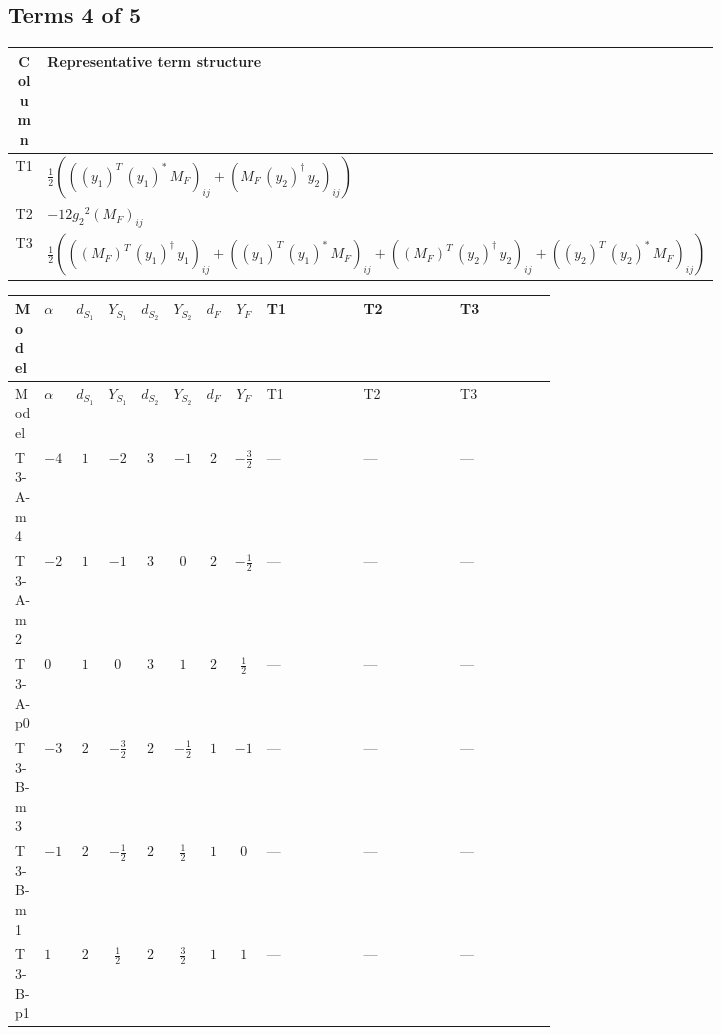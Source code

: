 \documentclass[8pt]{article}
\begin{document}
\begin{landscape}
\subsection*{Terms 4 of 5}
\begin{center}
\begin{tabular}{@{}c >{\raggedright\arraybackslash}p{0.82\linewidth}@{}}
\toprule
Column & Representative term structure \\
\midrule
T1 & \(\displaystyle \frac{1}{2} (\left(\left({y_1}\right)^{T}\,\left({y_1}\right)^{*}\,{M_F}\right)_{ij}+\left({M_F}\,\left({y_2}\right)^{\dagger}\,{y_2}\right)_{ij})\) \\
\midrule
T2 & \(\displaystyle -12 {g_2}^2 \left({M_F}\right)_{ij}\) \\
\midrule
T3 & \(\displaystyle \frac{1}{2} (\left(\left({M_F}\right)^{T}\,\left({y_1}\right)^{\dagger}\,{y_1}\right)_{ij}+\left(\left({y_1}\right)^{T}\,\left({y_1}\right)^{*}\,{M_F}\right)_{ij}+\left(\left({M_F}\right)^{T}\,\left({y_2}\right)^{\dagger}\,{y_2}\right)_{ij}+\left(\left({y_2}\right)^{T}\,\left({y_2}\right)^{*}\,{M_F}\right)_{ij})\) \\
\midrule
\bottomrule
\end{tabular}
\end{center}
\smallskip
\tiny
\begin{longtable}{@{}llcccccc >{\raggedright\arraybackslash}p{0.21\linewidth} >{\raggedright\arraybackslash}p{0.21\linewidth} >{\raggedright\arraybackslash}p{0.21\linewidth}@{}}
\toprule
Model & $\alpha$ & $d_{S_1}$ & $Y_{S_1}$ & $d_{S_2}$ & $Y_{S_2}$ & $d_F$ & $Y_F$ & T1 & T2 & T3 \\
\midrule
\endfirsthead
\toprule
Model & $\alpha$ & $d_{S_1}$ & $Y_{S_1}$ & $d_{S_2}$ & $Y_{S_2}$ & $d_F$ & $Y_F$ & T1 & T2 & T3 \\
\midrule
\endhead
T3-A-m4 & $-4$ & $1$ & $-2$ & $3$ & $-1$ & $2$ & $-\frac{3}{2}$ & --- & --- & --- \\
\midrule
T3-A-m2 & $-2$ & $1$ & $-1$ & $3$ & $0$ & $2$ & $-\frac{1}{2}$ & --- & --- & --- \\
\midrule
T3-A-p0 & $0$ & $1$ & $0$ & $3$ & $1$ & $2$ & $\frac{1}{2}$ & --- & --- & --- \\
\midrule
T3-B-m3 & $-3$ & $2$ & $-\frac{3}{2}$ & $2$ & $-\frac{1}{2}$ & $1$ & $-1$ & --- & --- & --- \\
\midrule
T3-B-m1 & $-1$ & $2$ & $-\frac{1}{2}$ & $2$ & $\frac{1}{2}$ & $1$ & $0$ & --- & --- & --- \\
\midrule
T3-B-p1 & $1$ & $2$ & $\frac{1}{2}$ & $2$ & $\frac{3}{2}$ & $1$ & $1$ & --- & --- & --- \\

\end{longtable}
\end{landscape}
\end{document}
